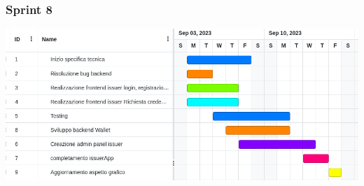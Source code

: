         \subsubsection{Sprint 8}
        \begin{center}
            \includegraphics[scale = 0.5]{./res/img/Sprint 8.png}
          \end{center}
